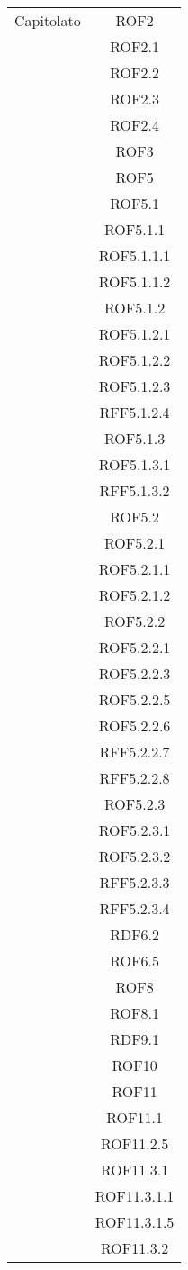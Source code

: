 \begin{longtable}{|c|c|}
\midrule
Capitolato
& ROF2\\
& ROF2.1\\
& ROF2.2\\
& ROF2.3\\
& ROF2.4\\
& ROF3\\
& ROF5\\
& ROF5.1\\
& ROF5.1.1\\
& ROF5.1.1.1\\
& ROF5.1.1.2\\
& ROF5.1.2\\
& ROF5.1.2.1\\
& ROF5.1.2.2\\
& ROF5.1.2.3\\
& RFF5.1.2.4\\
& ROF5.1.3\\
& ROF5.1.3.1\\
& RFF5.1.3.2\\
& ROF5.2\\
& ROF5.2.1\\
& ROF5.2.1.1\\
& ROF5.2.1.2\\
& ROF5.2.2\\
& ROF5.2.2.1\\
& ROF5.2.2.3\\
& ROF5.2.2.5\\
& ROF5.2.2.6\\
& RFF5.2.2.7\\
& RFF5.2.2.8\\
& ROF5.2.3\\
& ROF5.2.3.1\\
& ROF5.2.3.2\\
& RFF5.2.3.3\\
& RFF5.2.3.4\\
& RDF6.2\\
& ROF6.5\\
& ROF8\\
& ROF8.1\\
& RDF9.1\\
& ROF10\\
& ROF11\\
& ROF11.1\\
& ROF11.2.5\\
& ROF11.3.1\\
& ROF11.3.1.1\\
& ROF11.3.1.5\\
& ROF11.3.2\\

\end{longtable}
